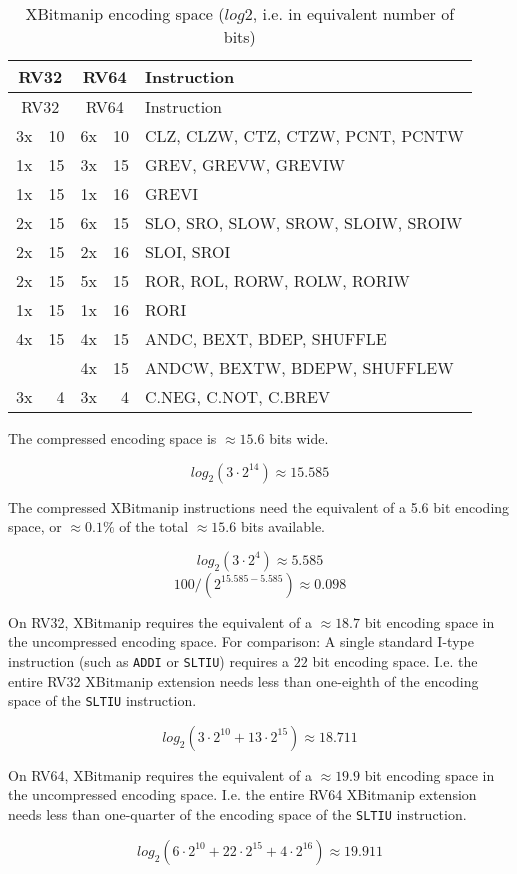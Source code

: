 \begin{longtable}[c]{@{}rr|rr|l@{}}
\caption{XBitmanip encoding space ($log2$, i.e. in equivalent number of bits)}\tabularnewline
\toprule
\multicolumn{2}{c}{RV32} & \multicolumn{2}{c}{RV64} & Instruction\tabularnewline
\midrule
\endfirsthead
\toprule
\multicolumn{2}{c}{RV32} & \multicolumn{2}{c}{RV64} & Instruction\tabularnewline
\midrule
\endhead
3x & 10 & 6x & 10 & CLZ, CLZW, CTZ, CTZW, PCNT, PCNTW\tabularnewline
\midrule
1x & 15 & 3x & 15 & GREV, GREVW, GREVIW\tabularnewline
1x & 15 & 1x & 16 & GREVI\tabularnewline
\midrule
2x & 15 & 6x & 15 & SLO, SRO, SLOW, SROW, SLOIW, SROIW\tabularnewline
2x & 15 & 2x & 16 & SLOI, SROI\tabularnewline
\midrule
2x & 15 & 5x & 15 & ROR, ROL, RORW, ROLW, RORIW\tabularnewline
1x & 15 & 1x & 16 & RORI\tabularnewline
\midrule
4x & 15 & 4x & 15 & ANDC, BEXT, BDEP, SHUFFLE\tabularnewline
   &    & 4x & 15 & ANDCW, BEXTW, BDEPW, SHUFFLEW\tabularnewline
\midrule
3x &  4 & 3x &  4 & C.NEG, C.NOT, C.BREV\tabularnewline
\bottomrule
\end{longtable}

The compressed encoding space is $\approx 15.6$ bits wide.

$$ log_2(3 \cdot 2^{14}) \approx 15.585 $$

The compressed XBitmanip instructions need the equivalent of a 5.6 bit
encoding space, or $\approx 0.1\%$ of the total $\approx 15.6$ bits available.

$$ log_2(3 \cdot 2^4) \approx 5.585 $$
$$ 100 / (2^{15.585-5.585}) \approx 0.098 $$

On RV32, XBitmanip requires the equivalent of a $\approx 18.7$ bit encoding space in
the uncompressed encoding space. For comparison: A single standard I-type
instruction (such as \texttt{ADDI} or \texttt{SLTIU}) requires a $22$ bit
encoding space. I.e. the entire RV32 XBitmanip extension needs less than
one-eighth of the encoding space of the \texttt{SLTIU} instruction.

$$ log_2(3\cdot2^{10} + 13\cdot2^{15}) \approx 18.711 $$

On RV64, XBitmanip requires the equivalent of a $\approx 19.9$ bit encoding
space in the uncompressed encoding space. I.e. the entire RV64 XBitmanip
extension needs less than one-quarter of the encoding space of the
\texttt{SLTIU} instruction.

$$ log_2(6\cdot2^{10} + 22\cdot2^{15} + 4\cdot2^{16}) \approx 19.911 $$

